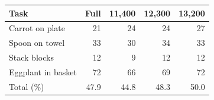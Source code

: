 \begingroup
  \centering
  \caption{\textbf{Per-task success beyond LIBERO.}
  Columns give total context tokens.}
  \label{tab:supp_pertask_transfer}
  \label{tab:supp_pertask_gr1}
  \label{tab:supp_pertask_bridge}
  \scriptsize
  \setlength{\tabcolsep}{3pt}
  \renewcommand{\arraystretch}{0.98}
  \begin{subtable}[t]{\linewidth}
    \centering
    \caption{SIMPLER-Bridge (mimic-video): successes of 72 episodes per task, three seeds evaluated.}
    \begin{tabular}{@{}lrrrr@{}}
    \toprule
    Task & Full & 11,400 & 12,300 & 13,200 \\
    \midrule
    Carrot on plate & 21 & 24 & 24 & 27 \\
    Spoon on towel & 33 & 30 & 34 & 33 \\
    Stack blocks & 12 & 9 & 12 & 12 \\
    Eggplant in basket & 72 & 66 & 69 & 72 \\
    \midrule
    Total (\%) & 47.9 & 44.8 & 48.3 & 50.0 \\
    \bottomrule
  \end{tabular}
  \end{subtable}

